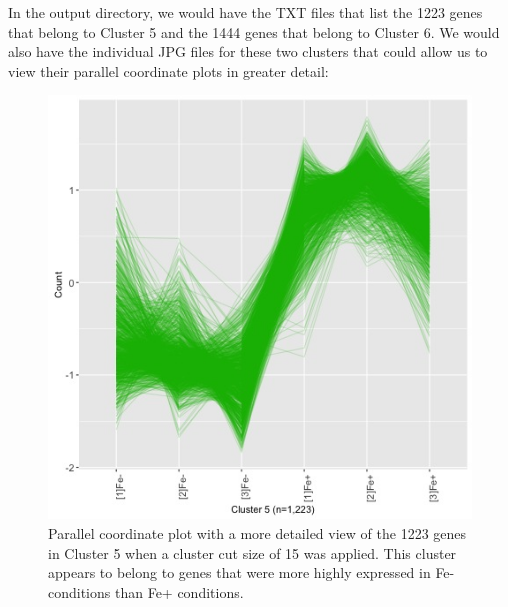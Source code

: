 \documentclass[11pt,a4paper,oldfontcommands,openany]{memoir}
\numberwithin{equation}{section} %
\begin{document}
In the output directory, we would have the TXT files that list the 1223 genes that belong to Cluster 5 and the 1444 genes that belong to Cluster 6. We would also have the individual JPG files for these two clusters that could allow us to view their parallel coordinate plots in greater detail:

\begin{figure}[H]
  \begin{framed}
  \centering
  \includegraphics[width=\textwidth]{L120_15_5}
  \end{framed}
  \caption{Parallel coordinate plot with a more detailed view of the 1223 genes in Cluster 5 when a cluster cut size of 15 was applied. This cluster appears to belong to genes that were more highly expressed in Fe- conditions than Fe+ conditions.}
  \label{fig:L120_15_5}
\end{figure}
\end{document}
